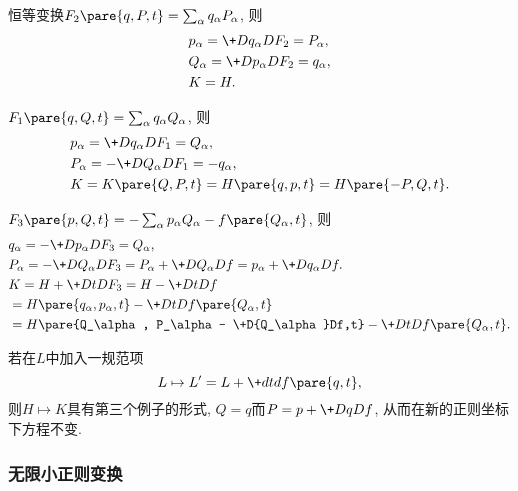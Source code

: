 \documentclass[../LectureNotes.tex]{subfiles}
\begin{document}
\begin{cenum}
    \item 恒等变换$F_2\pare{q,P,t} = \sum_\alpha q_\alpha P_\alpha$, 则
    \begin{align*}
        & p_\alpha = \+D{q_\alpha}D{F_2} = P_\alpha, \\
        & Q_\alpha = \+D{p_\alpha}D{F_2} = q_\alpha, \\
        & K = H.
    \end{align*}
    \item $F_1\pare{q,Q,t} = \sum_\alpha q_\alpha Q_\alpha$, 则
    \begin{align*}
        & p_\alpha = \+D{q_\alpha}D{F_1} = Q_\alpha, \\
        & P_\alpha = -\+D{Q_\alpha}D{F_1} = -q_\alpha, \\
        & K = K\pare{Q,P,t} = H\pare{q,p,t} = H\pare{-P,Q,t}.
    \end{align*}
    \item $F_3\pare{p,Q,t} = -\sum_\alpha p_\alpha Q_\alpha - f\pare{Q_\alpha,t}$, 则
    \begin{align*}
        & q_\alpha = -\+D{p_\alpha}D{F_3} = Q_\alpha, \\
        & P_\alpha = -\+D{Q_\alpha}D{F_3} = P_\alpha + \+D{Q_\alpha}Df = p_\alpha + \+D{q_\alpha}Df. \\
        & K = H + \+DtD{F_3} = H - \+DtDf \\
        &= H\pare{q_\alpha,p_\alpha,t} - \+DtD{f\pare{Q_\alpha,t}} \\
        &= H\pare{Q_\alpha, P_\alpha - \+D{Q_\alpha}Df,t} - \+DtD{f\pare{Q_\alpha,t}}.
    \end{align*}
\end{cenum}
\begin{remark}
    若在$L$中加入一规范项
    \[ L \mapsto L' = L + \+dtd{f\pare{q,t}}, \]
    则$H\mapsto K$具有第三个例子的形式, $Q=q$而$P=\displaystyle p+\+D{q}Df$, 从而在新的正则坐标下方程不变.
\end{remark}


\subsubsection{无限小正则变换} %
\label{ssub:无限小正则变换}
\end{document}
